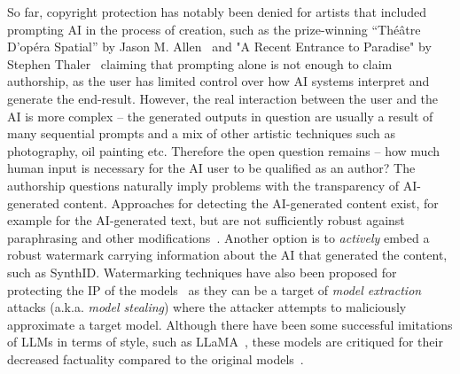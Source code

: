 So far, copyright protection has notably been denied for artists that included prompting AI in the process of creation, such as the prize-winning “Théâtre D’opéra Spatial” by Jason M. Allen~\cite{roose_ai-generated_2022} and "A Recent Entrance to Paradise" by Stephen Thaler~\cite{brodkin_us_2023} claiming that prompting alone is not enough to claim authorship, as the user has limited control over how AI systems interpret and generate the end-result. 
However, the real interaction between the user and the AI is more complex -- the generated outputs in question are usually a result of many sequential prompts and a mix of other artistic techniques such as photography, oil painting etc. 
Therefore the open question remains -- how much human input is necessary for the AI user to be qualified as an author? 
The authorship questions naturally imply problems with the transparency of AI-generated content. 
Approaches for detecting the AI-generated content exist, for example for the AI-generated text, but are not sufficiently robust against paraphrasing and other modifications~\cite{sadasivan_can_2024}. 
Another option is to \textit{actively} embed a robust watermark carrying information about the AI that generated the content, such as SynthID.%
Watermarking techniques have also been proposed for protecting the IP of the models~\cite{ong_protecting_2021} as they can be a target of \textit{model extraction} attacks (a.k.a. \textit{model stealing}) where the attacker attempts to maliciously approximate a target model.
Although there have been some successful imitations of LLMs in terms of style, such as LLaMA~\cite{touvron_llama_2023}, these models are critiqued for their decreased factuality compared to the original models~\cite{gudibande_false_2023}.
